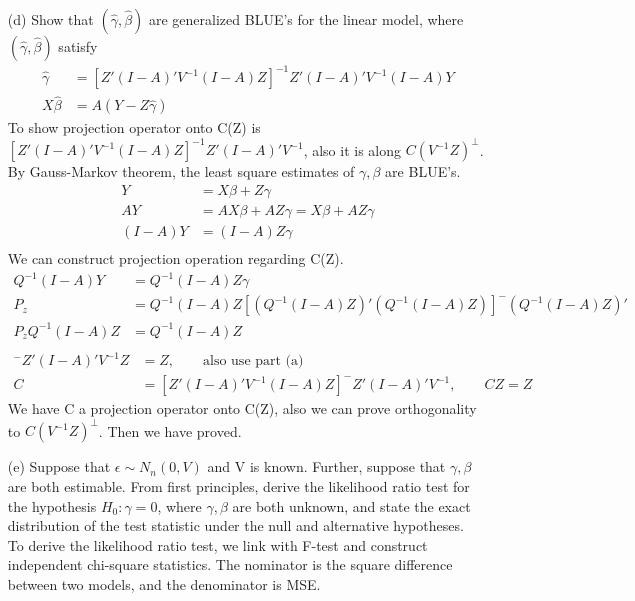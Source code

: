 \documentclass{homework}
\begin{document}
\begin{itemize}
\begin{align*}
\end{align*}
\item[(d)] Show that $(\hat{\gamma}, \hat{\beta})$ are generalized BLUE's for the linear model, where $(\hat{\gamma}, \hat{\beta})$ satisfy
\begin{align*}
\hat{\gamma} &= [Z'(I-A)' V^{-1} (I-A)Z]^{-1} Z'(I-A)' V^{-1} (I-A)Y\\
X\hat{\beta} &= A(Y-Z \hat{\gamma})
\end{align*}
To show projection operator onto C(Z) is $[Z'(I-A)' V^{-1} (I-A)Z]^{-1} Z'(I-A)' V^{-1}$, also it is along $C(V^{-1} Z)^{\perp}$.\\
By Gauss-Markov theorem, the least square estimates of $\gamma, \beta$ are BLUE's. 
\begin{align*}
Y &= X\beta + Z\gamma \\
AY &= AX\beta + AZ\gamma = X\beta + AZ\gamma \\
(I-A)Y &= (I-A)Z \gamma\\
\end{align*}
We can construct projection operation regarding C(Z).
\begin{align*}
Q^{-1}(I-A)Y &= Q^{-1}(I-A)Z \gamma\\
P_z &= Q^{-1}(I-A)Z [(Q^{-1}(I-A)Z)' (Q^{-1}(I-A)Z)]^{-} (Q^{-1}(I-A)Z)' \\
P_z Q^{-1}(I-A)Z &= Q^{-1}(I-A)Z \\
\end{align*}
\begin{align*}
[Z'(I-A)'V^{-1}(I-A)Z]^{-}Z'(I-A)'V^{-1} Z&=  Z, \qquad \text{also use part (a)}\\
C &= [Z'(I-A)'V^{-1}(I-A)Z]^{-}Z'(I-A)'V^{-1}, \qquad CZ = Z
\end{align*}
We have C a projection operator onto C(Z), also we can prove orthogonality to $C(V^{-1} Z)^{\perp}$.
Then we have proved.
\item[(e)] Suppose that $\epsilon \sim N_n(0, V )$ and V is known. Further, suppose that
 $\gamma, \beta$ are both estimable. From first principles, derive the likelihood ratio test for
the hypothesis $H_0: \gamma= 0 $, where $\gamma, \beta$ are both unknown, and state the exact
distribution of the test statistic under the null and alternative hypotheses.\\
To derive the likelihood ratio test, we link with F-test and construct independent chi-square statistics. The nominator is the square difference between two models, and the denominator is MSE.\\
\begin{align*}

\end{align*}
\end{itemize}
\end{document}
